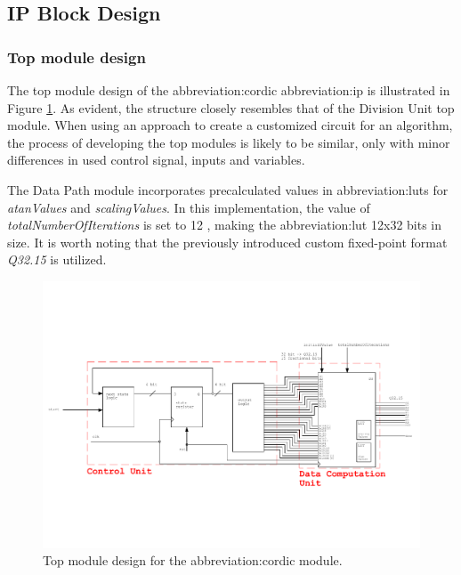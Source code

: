 \documentclass[a4paper, twoside, 11pt]{article}
\newcommand{\fbar}{\FloatBarrier}
\begin{document}
    \fbar
    \subsection{IP Block Design}
    \fbar
        \subsubsection{Top module design}
            The top module design of the \gls{abbreviation:cordic} \gls{abbreviation:ip} is illustrated in Figure \ref{fig:cordic-top-module}. As evident, the structure closely resembles that of the Division Unit top module. When using an approach to create a customized circuit for an algorithm, the process of developing the top modules is likely to be similar, only with minor differences in used control signal, inputs and variables.\par
            The Data Path module incorporates precalculated values in \gls{abbreviation:lut}s for \textit{atanValues} and \textit{scalingValues}. In this implementation, the value of \textit{totalNumberOfIterations} is set to 12 , making the \gls{abbreviation:lut} 12x32 bits in size. It is worth noting that the previously introduced custom fixed-point format \textit{Q32.15} is utilized.
            \begin{figure}[htbp!]
                \centering
                \includegraphics[width=1\textwidth]{src/pdf/cordic-top-module.pdf}
                \caption{Top module design for the \gls{abbreviation:cordic} module.}
                \label{fig:cordic-top-module}
            \end{figure}
        \fbar
\end{document}
